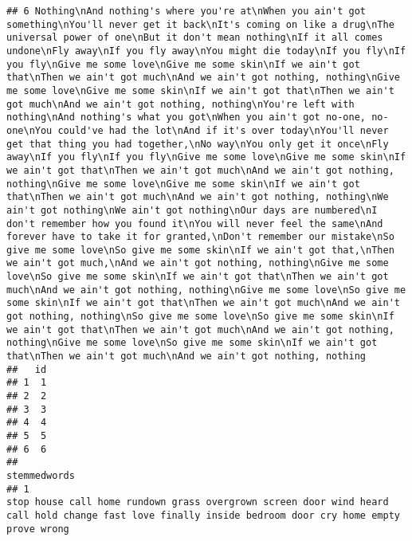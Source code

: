 \documentclass[]{article}
\begin{document}
\begin{verbatim}
## 6 Nothing\nAnd nothing's where you're at\nWhen you ain't got something\nYou'll never get it back\nIt's coming on like a drug\nThe universal power of one\nBut it don't mean nothing\nIf it all comes undone\nFly away\nIf you fly away\nYou might die today\nIf you fly\nIf you fly\nGive me some love\nGive me some skin\nIf we ain't got that\nThen we ain't got much\nAnd we ain't got nothing, nothing\nGive me some love\nGive me some skin\nIf we ain't got that\nThen we ain't got much\nAnd we ain't got nothing, nothing\nYou're left with nothing\nAnd nothing's what you got\nWhen you ain't got no-one, no-one\nYou could've had the lot\nAnd if it's over today\nYou'll never get that thing you had together,\nNo way\nYou only get it once\nFly away\nIf you fly\nIf you fly\nGive me some love\nGive me some skin\nIf we ain't got that\nThen we ain't got much\nAnd we ain't got nothing, nothing\nGive me some love\nGive me some skin\nIf we ain't got that\nThen we ain't got much\nAnd we ain't got nothing, nothing\nWe ain't got nothing\nWe ain't got nothing\nOur days are numbered\nI don't remember how you found it\nYou will never feel the same\nAnd forever have to take it for granted,\nDon't remember our mistake\nSo give me some love\nSo give me some skin\nIf we ain't got that,\nThen we ain't got much,\nAnd we ain't got nothing, nothing\nGive me some love\nSo give me some skin\nIf we ain't got that\nThen we ain't got much\nAnd we ain't got nothing, nothing\nGive me some love\nSo give me some skin\nIf we ain't got that\nThen we ain't got much\nAnd we ain't got nothing, nothing\nSo give me some love\nSo give me some skin\nIf we ain't got that\nThen we ain't got much\nAnd we ain't got nothing, nothing\nGive me some love\nSo give me some skin\nIf we ain't got that\nThen we ain't got much\nAnd we ain't got nothing, nothing
##   id
## 1  1
## 2  2
## 3  3
## 4  4
## 5  5
## 6  6
##                                                                                                                                                                                                                                                                                                                                                                                                                                                                                                                                                                                                                                                                          stemmedwords
## 1                                                                                                                                                                                                                                                                                                                                                                                                                                                                                                                               stop house call home rundown grass overgrown screen door wind heard call hold change fast love finally inside bedroom door cry home empty prove wrong

\end{verbatim}
\end{document}
